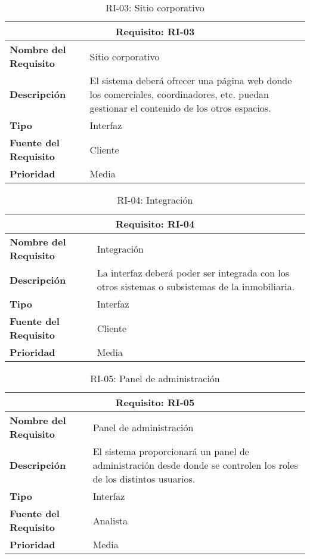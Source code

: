 \begin{table}[H]
\begin{center}
\begin{tabular}{p{} p{7cm}}
\multicolumn{2}{c}{\textbf{Requisito: RI-03} } \\
\hline \hline
\textbf{Nombre del Requisito} & Sitio corporativo  \\
\hline
\textbf{Descripción} & El sistema deberá ofrecer una página web donde los comerciales, coordinadores, etc. puedan gestionar el contenido de los otros espacios. \\
\hline
\textbf{Tipo} & Interfaz \\
\hline
\textbf{Fuente del Requisito} & Cliente  \\
\hline
\textbf{Prioridad} & Media  \\ \hline
\end{tabular}
\caption{RI-03: Sitio corporativo}
\label{tab:RI-03}
\end{center}
\end{table}

\begin{table}[H]
\begin{center}
\begin{tabular}{p{} p{7cm}}
\multicolumn{2}{c}{\textbf{Requisito: RI-04} } \\
\hline \hline
\textbf{Nombre del Requisito} & Integración  \\
\hline
\textbf{Descripción} & La interfaz deberá poder ser integrada con los otros sistemas o subsistemas de la inmobiliaria.  \\
\hline
\textbf{Tipo} & Interfaz \\
\hline
\textbf{Fuente del Requisito} & Cliente  \\
\hline
\textbf{Prioridad} & Media  \\ \hline
\end{tabular}
\caption{RI-04: Integración}
\label{tab:RI-04}
\end{center}
\end{table}

\begin{table}[H]
\begin{center}
\begin{tabular}{p{} p{7cm}}
\multicolumn{2}{c}{\textbf{Requisito: RI-05} } \\
\hline \hline
\textbf{Nombre del Requisito} & Panel de administración  \\
\hline
\textbf{Descripción} & El sistema proporcionará un panel de administración desde donde se controlen los roles de los distintos usuarios.  \\
\hline
\textbf{Tipo} & Interfaz \\
\hline
\textbf{Fuente del Requisito} & Analista  \\
\hline
\textbf{Prioridad} & Media  \\ \hline
\end{tabular}
\caption{RI-05: Panel de administración}
\label{tab:RI-05}
\end{center}
\end{table}
